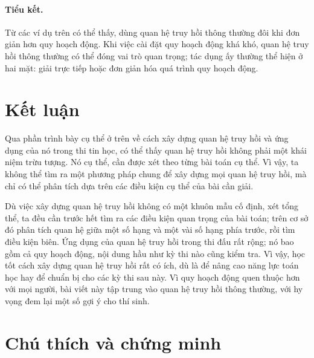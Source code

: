 \documentclass[11pt]{article}
\begin{document}
\paragraph{Tiểu kết.}
Từ các ví dụ trên có thể thấy, dùng quan hệ truy hồi thông thường đôi khi đơn
giản hơn quy hoạch động. Khi việc cài đặt quy hoạch động khá khó, quan hệ
truy hồi thông thường có thể đóng vai trò quan trọng; tác dụng ấy thường thể
hiện ở hai mặt: giải trực tiếp hoặc đơn giản hóa quá trình quy hoạch động.

\section{Kết luận}

Qua phần trình bày cụ thể ở trên về cách xây dựng quan hệ truy hồi và ứng
dụng của nó trong thi tin học, có thể thấy quan hệ truy hồi không phải một
khái niệm trừu tượng. Nó cụ thể, cần được xét theo từng bài toán cụ thể. Vì
vậy, ta không thể tìm ra một phương pháp chung để xây dựng mọi quan hệ truy
hồi, mà chỉ có thể phân tích dựa trên các điều kiện cụ thể của bài cần giải.

Dù việc xây dựng quan hệ truy hồi không có một khuôn mẫu cố định, xét tổng
thể, ta đều cần trước hết tìm ra các điều kiện quan trọng của bài toán; trên
cơ sở đó phân tích quan hệ giữa một số hạng và một vài số hạng phía trước,
rồi tìm điều kiện biên. Ứng dụng của quan hệ truy hồi trong thi đấu rất rộng;
nó bao gồm cả quy hoạch động, nội dung hầu như kỳ thi nào cũng kiểm tra. Vì
vậy, học tốt cách xây dựng quan hệ truy hồi rất có ích, dù là để nâng cao
năng lực toán học hay để chuẩn bị cho các kỳ thi sau này. Vì quy hoạch động
quen thuộc hơn với mọi người, bài viết này tập trung vào quan hệ truy hồi
thông thường, với hy vọng đem lại một số gợi ý cho thí sinh.

\appendix

\section{Chú thích và chứng minh}
\end{document}
